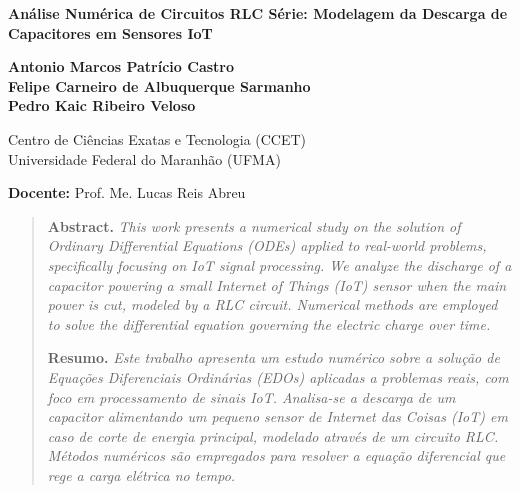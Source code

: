 \documentclass[12pt, a4paper]{article}
\begin{document}
\begin{center}
    {\Large \bfseries Análise Numérica de Circuitos RLC Série: Modelagem da Descarga de Capacitores em Sensores IoT\par}
    \vspace{0.8cm}
    
    {\normalsize     
    \textbf{Antonio Marcos Patrício Castro}\\
    \textbf{Felipe Carneiro de Albuquerque Sarmanho} \\
    \textbf{Pedro Kaic Ribeiro Veloso}
    \par}
    \vspace{0.4cm}
    
    {\normalsize Centro de Ciências Exatas e Tecnologia (CCET) \\
    Universidade Federal do Maranhão (UFMA)\par}
    \vspace{0.2cm}
    
    {\normalsize \textbf{Docente:} Prof. Me. Lucas Reis Abreu\par}
\end{center}

\vspace{0.2cm}

\begin{quote}
    \noindent\small
    \textbf{Abstract.} \textit{This work presents a numerical study on the solution of Ordinary Differential Equations (ODEs) applied to real-world problems, specifically focusing on IoT signal processing. We analyze the discharge of a capacitor powering a small Internet of Things (IoT) sensor when the main power is cut, modeled by a RLC circuit. Numerical methods are employed to solve the differential equation governing the electric charge over time.}
    
    \vspace{0.3cm} %
    
    \noindent
    \textbf{Resumo.} \textit{Este trabalho apresenta um estudo numérico sobre a solução de Equações Diferenciais Ordinárias (EDOs) aplicadas a problemas reais, com foco em processamento de sinais IoT. Analisa-se a descarga de um capacitor alimentando um pequeno sensor de Internet das Coisas (IoT) em caso de corte de energia principal, modelado através de um circuito RLC. Métodos numéricos são empregados para resolver a equação diferencial que rege a carga elétrica no tempo.}
\end{quote}
\end{document}
